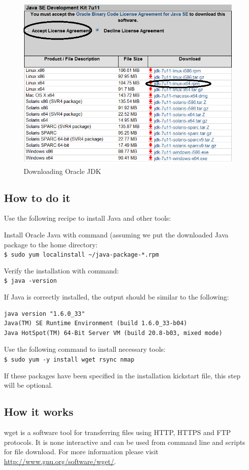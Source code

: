 \begin{figure}[h]
  \centering
  \includegraphics[width=.6\textwidth]{figs/5163os_02_04.png}
  \caption{Downloading Oracle JDK}\label{fig:oracle.jdk}
\end{figure} 

\subsection*{How to do it}
Use the following recipe to install Java and other tools:

Install Oracle Java with command (assuming we put the downloaded Java package to the home directory: \\
\verb|$ sudo yum localinstall ~/java-package-*.rpm|

Verify the installation with command: \\
\verb|$ java -version|

If Java is correctly installed, the output should be similar to the following:
\lstset{style=bashstyle}
\begin{lstlisting}
java version "1.6.0_33"
Java(TM) SE Runtime Environment (build 1.6.0_33-b04)
Java HotSpot(TM) 64-Bit Server VM (build 20.8-b03, mixed mode)
\end{lstlisting}

Use the following command to install necessary tools: \\
\verb|$ sudo yum -y install wget rsync nmap|

If these packages have been specified in the installation kickstart file, this step will be optional.

\subsection*{How it works}
wget\emph{} is a software tool for transferring files using HTTP, HTTPS and FTP protocols. It is none interactive and can be used from command line and scripts for file download. For more information please visit \href{http://www.gnu.org/software/wget/}{http://www.gnu.org/software/wget/}.

